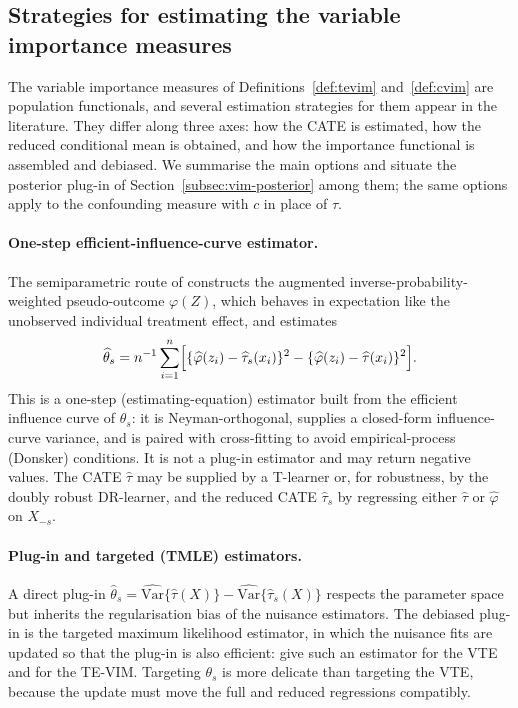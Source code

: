 \documentclass[11pt]{report}
\theoremstyle{plain}
\theoremstyle{definition}
\theoremstyle{remark}
\newcommand{\1}{\mathds{1}}
\theoremstyle{plain}
\theoremstyle{remark}
\newcommand{\Var}{\mathrm{Var}}
\begin{document}
\subsection{Strategies for estimating the variable importance measures}
\label{subsec:vim-estimation}

The variable importance measures of Definitions~\ref{def:tevim}
and~\ref{def:cvim} are population functionals, and several estimation strategies
for them appear in the literature. They differ along three axes: how the CATE is
estimated, how the reduced conditional mean is obtained, and how the importance
functional is assembled and debiased. We summarise the main options and situate
the posterior plug-in of Section~\ref{subsec:vim-posterior} among them; the same
options apply to the confounding measure with $c$ in place of $\tau$.

\paragraph{One-step efficient-influence-curve estimator.}
The semiparametric route of \citet{hines2022} constructs the augmented
inverse-probability-weighted pseudo-outcome $\varphi(Z)$, which behaves in
expectation like the unobserved individual treatment effect, and estimates
\[
\widehat\theta_s = n^{-1}\sum_{i=1}^n
\Bigl[ \{\widehat\varphi(z_i) - \widehat\tau_s(x_i)\}^2
      - \{\widehat\varphi(z_i) - \widehat\tau(x_i)\}^2 \Bigr].
\]
This is a one-step (estimating-equation) estimator built from the efficient
influence curve of $\theta_s$: it is Neyman-orthogonal, supplies a closed-form
influence-curve variance, and is paired with cross-fitting to avoid
empirical-process (Donsker) conditions. It is not a plug-in estimator and may
return negative values. The CATE $\widehat\tau$ may be supplied by a T-learner
or, for robustness, by the doubly robust DR-learner, and the reduced CATE
$\widehat\tau_s$ by regressing either $\widehat\tau$ or $\widehat\varphi$ on
$X_{-s}$.

\paragraph{Plug-in and targeted (TMLE) estimators.}
A direct plug-in $\widehat\theta_s = \widehat{\Var}\{\widehat\tau(X)\} -
\widehat{\Var}\{\widehat\tau_s(X)\}$ respects the parameter space but inherits
the regularisation bias of the nuisance estimators. The debiased plug-in is the
targeted maximum likelihood estimator, in which the nuisance fits are updated so
that the plug-in is also efficient: \citet{levy2021} give such an estimator for
the VTE and \citet{li2023} for the TE-VIM. Targeting $\theta_s$ is more delicate
than targeting the VTE, because the update must move the full and reduced
regressions compatibly.
\end{document}
